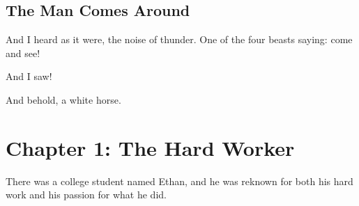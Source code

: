 \documentclass[a4paper,12pt,twoside]{book}
\begin{document}
\section{The Man Comes Around}
And I heard as it were, the noise of thunder.  One of the four beasts saying: come and see!

And I saw! 

And behold, a white horse.

\chapter{Chapter 1: The Hard Worker}
There was a college student named Ethan, and he was reknown for both his hard work and his passion for what he did.  


 
\end{document}
